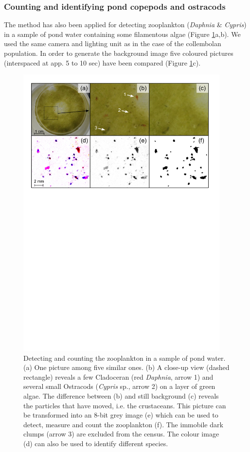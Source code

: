 \subsubsection{Counting and identifying pond copepods and ostracods}

The method has also been applied for detecting zooplankton (\textit{Daphnia} \&
\textit{Cypris}) in a sample of pond water containing some filamentous algae
(Figure \ref{Fig21-3}a,b). We used the same camera and lighting unit as in the case of the collembolan population.
In order to generate the background image five coloured pictures (interspaced at
app. 5 to 10 sec) have been compared (Figure \ref{Fig21-3}c).

\begin{figure}[!ht] %
\centering
\includegraphics[width=0.95\textwidth]{2_Methodo/Fig/3_Daphnies.pdf} 
\caption[ Detecting and counting the zooplankton in a sample of pond water]{ Detecting and counting the zooplankton in a sample of pond water. (a) One
picture among five similar ones. (b) A close-up view (dashed rectangle) reveals
a few Cladoceran (red \textit{Daphnia}, arrow 1) and several small Ostracods (\textit{Cypris} sp.,
arrow 2) on a layer of green algae. The difference between (b) and still
background (c) reveals the particles that have moved, i.e. the crustaceans. This
picture can be transformed into an 8-bit grey image (e) which can be used to
detect, measure and count the zooplankton (f). The immobile dark clumps (arrow
3) are excluded from the census. The colour image (d) can also be used to
identify different species.}
\label{Fig21-3}
\end{figure}

